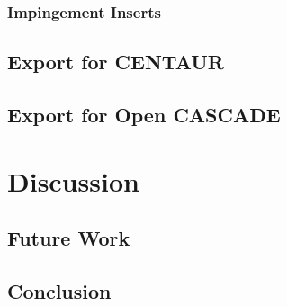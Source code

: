 \documentclass[a4paper, 11pt]{report}
\theoremstyle{definition}
\begin{document}
\subsection{Impingement Inserts}
\section{Export for CENTAUR}
\section{Export for Open CASCADE}

\chapter{Discussion}
\section{Future Work}
\section{Conclusion}
\cite{Piegl1997}

\printbibliography[heading=bibnumbered, title=References]
\end{document}
